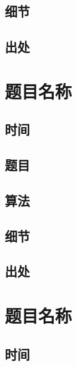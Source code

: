 \documentclass[a4paper]{article}
\begin{document}
		
		
	\subsection{细节}
		
		
		
	\subsection{出处}
		
		
	
	\newpage
	
	\section{题目名称}
		
	\subsection{时间}
		
		
		
	\subsection{题目}
		
		
		
	\subsection{算法}
		
		
		
	\subsection{细节}
		
		
		
	\subsection{出处}
		
		
	
	\newpage
	
	\section{题目名称}
		
	\subsection{时间}
		
\end{document}
